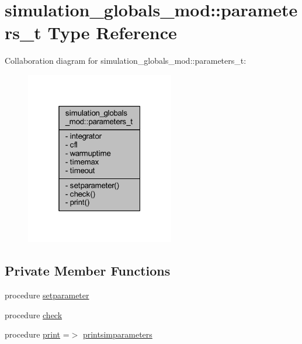 \hypertarget{structsimulation__globals__mod_1_1parameters__t}{}\section{simulation\+\_\+globals\+\_\+mod\+:\+:parameters\+\_\+t Type Reference}
\label{structsimulation__globals__mod_1_1parameters__t}


Collaboration diagram for simulation\+\_\+globals\+\_\+mod\+:\+:parameters\+\_\+t\+:\nopagebreak
\begin{figure}[H]
\begin{center}
\leavevmode
\includegraphics[width=184pt]{structsimulation__globals__mod_1_1parameters__t__coll__graph}
\end{center}
\end{figure}
\subsection*{Private Member Functions}
\begin{DoxyCompactItemize}
\item 
procedure \mbox{\hyperlink{structsimulation__globals__mod_1_1parameters__t_ab4df8a29214aa31b554483bb8c07004c}{setparameter}}
\item 
procedure \mbox{\hyperlink{structsimulation__globals__mod_1_1parameters__t_ab0dc483d1a0d000e43726c19c892a65d}{check}}
\item 
procedure \mbox{\hyperlink{structsimulation__globals__mod_1_1parameters__t_a220b7b25f77a4e33694055d5427a30dd}{print}} =$>$ \mbox{\hyperlink{namespacesimulation__globals__mod_a97c04d0289a9f2d004a9329cb7ab16f0}{printsimparameters}}
\end{DoxyCompactItemize}
